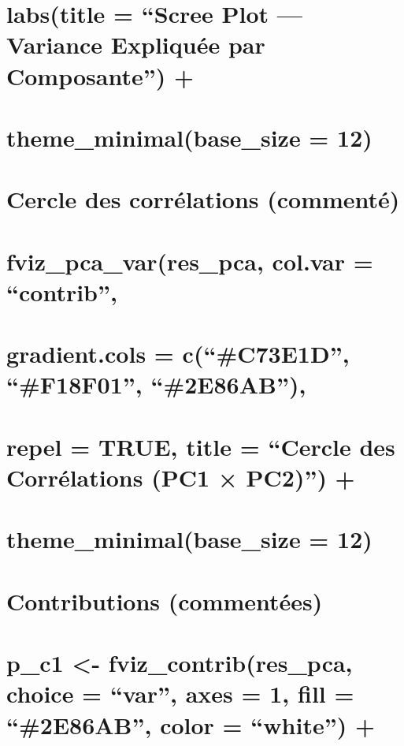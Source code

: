 \documentclass[
]{article}
\begin{document}
\section{labs(title = ``Scree Plot --- Variance Expliquée par
Composante'')
+}\label{labstitle-scree-plot-variance-expliquuxe9e-par-composante}

\section{theme\_minimal(base\_size =
12)}\label{theme_minimalbase_size-12}

\section{Cercle des corrélations
(commenté)}\label{cercle-des-corruxe9lations-commentuxe9}

\section{fviz\_pca\_var(res\_pca, col.var =
``contrib'',}\label{fviz_pca_varres_pca-col.var-contrib}

\section{gradient.cols = c(``\#C73E1D'', ``\#F18F01'',
``\#2E86AB''),}\label{gradient.cols-cc73e1d-f18f01-2e86ab}

\section{repel = TRUE, title = ``Cercle des Corrélations (PC1 × PC2)'')
+}\label{repel-true-title-cercle-des-corruxe9lations-pc1-pc2}

\section{theme\_minimal(base\_size =
12)}\label{theme_minimalbase_size-12-1}

\section{Contributions (commentées)}\label{contributions-commentuxe9es}

\section{p\_c1 \textless- fviz\_contrib(res\_pca, choice = ``var'', axes
= 1, fill = ``\#2E86AB'', color = ``white'')
+}\label{p_c1---fviz_contribres_pca-choice-var-axes-1-fill-2e86ab-color-white}
\end{document}
